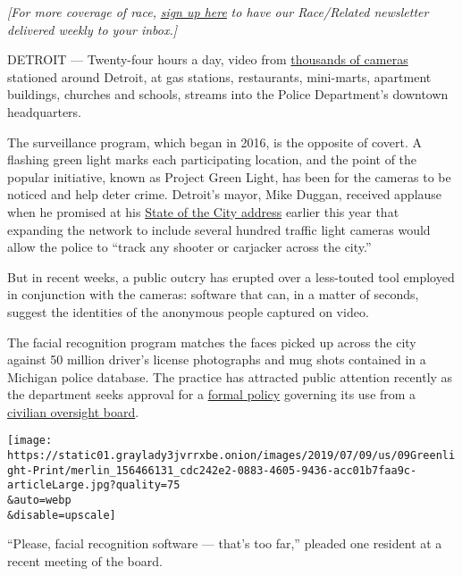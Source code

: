 \emph{{[}For more coverage of race,}
\emph{\href{https://www.nytimes3xbfgragh.onion/2018/10/01/us/subscribe-race-related-newsletter.html?module=inline}{sign
up here}} \emph{to have our Race/Related newsletter delivered weekly to
your inbox.{]}}

DETROIT --- Twenty-four hours a day, video from
\href{https://detroitmi.gov/webapp/project-green-light-map}{thousands of
cameras} stationed around Detroit, at gas stations, restaurants,
mini-marts, apartment buildings, churches and schools, streams into the
Police Department's downtown headquarters.

The surveillance program, which began in 2016, is the opposite of
covert. A flashing green light marks each participating location, and
the point of the popular initiative, known as Project Green Light, has
been for the cameras to be noticed and help deter crime. Detroit's
mayor, Mike Duggan, received applause when he promised at his
\href{https://www.youtube.com/watch?v=dXAZoMCl3qs}{State of the City
address} earlier this year that expanding the network to include several
hundred traffic light cameras would allow the police to ``track any
shooter or carjacker across the city.''

But in recent weeks, a public outcry has erupted over a less-touted tool
employed in conjunction with the cameras: software that can, in a matter
of seconds, suggest the identities of the anonymous people captured on
video.

The facial recognition program matches the faces picked up across the
city against 50 million driver's license photographs and mug shots
contained in a Michigan police database. The practice has attracted
public attention recently as the department seeks approval for a
\href{https://detroitmi.gov/document/facial-recognition}{formal policy}
governing its use from a
\href{https://detroitmi.gov/government/boards/board-police-commissioners}{civilian
oversight board}.

\texttt{[image: https://static01.graylady3jvrrxbe.onion/images/2019/07/09/us/09Greenlight-Print/merlin\_156466131\_cdc242e2-0883-4605-9436-acc01b7faa9c-articleLarge.jpg?quality=75\\\&auto=webp\\\&disable=upscale]}

``Please, facial recognition software --- that's too far,'' pleaded one
resident at a recent meeting of the board.

